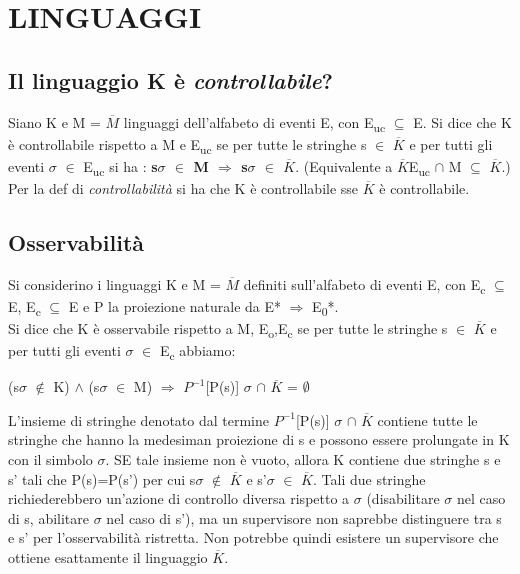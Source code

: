 \documentclass[a4paper]{article}
\begin{document}
\section{LINGUAGGI}
\subsection{Il linguaggio K è \emph{controllabile}?}
Siano K e M = $\overline{M}$ linguaggi dell'alfabeto di eventi E, con E\textsubscript{uc} $\subseteq$ E. Si dice che K è controllabile rispetto a M e E\textsubscript{uc} se per tutte le stringhe s $\in$ $\overline{K}$ e per tutti gli eventi $\sigma$ $\in$ E\textsubscript{uc} si ha : \textbf{s$\sigma$ $\in$ M $\Rightarrow$ s$\sigma$ $\in$ $\overline{K}$}. (Equivalente a $\overline{K}$E\textsubscript{uc} $\cap$ M $\subseteq$ $\overline{K}$.)\\ Per la def di \emph{controllabilità} si ha che K è controllabile sse $\overline{K}$ è controllabile.
\subsection{Osservabilità}
Si considerino i linguaggi K e M = $\overline{M}$ definiti sull'alfabeto di eventi E, con E\textsubscript{c} $\subseteq$ E, E\textsubscript{c} $\subseteq$ E e P la proiezione naturale da E* $\Rightarrow$ E\textsubscript{0}*.\\ Si dice che K è osservabile rispetto a M, E\textsubscript{o},E\textsubscript{c} se per tutte le stringhe s $\in$ $\overline{K}$ e per tutti gli eventi $\sigma$ $\in$ E\textsubscript{c} abbiamo: 
\begin{center}(s$\sigma$ $\notin$ K) $\land$ (s$\sigma$ $\in$ M) $\Rightarrow$ $P^{-1}$[P(s)] $\sigma$  $\cap$ $\overline{K}$ = $\emptyset$
\end{center}
L'insieme di stringhe denotato dal termine $P^{-1}$[P(s)] $\sigma$  $\cap$ $\overline{K}$ contiene tutte le stringhe che hanno la medesiman proiezione di s e possono essere prolungate in K con il simbolo $\sigma$. SE tale insieme non è vuoto, allora K contiene due stringhe s e s' tali che P(s)=P(s') per cui s$\sigma$ $\notin$ $\overline{K}$ e s'$\sigma$ $\in$ $\overline{K}$. Tali due stringhe richiederebbero un'azione di controllo diversa rispetto a $\sigma$ (disabilitare $\sigma$ nel caso di s, abilitare $\sigma$ nel caso di s'), ma un supervisore non saprebbe distinguere tra s e s' per l'osservabilità ristretta. Non potrebbe quindi esistere un supervisore che ottiene esattamente il linguaggio $\overline{K}$.
\end{document}
